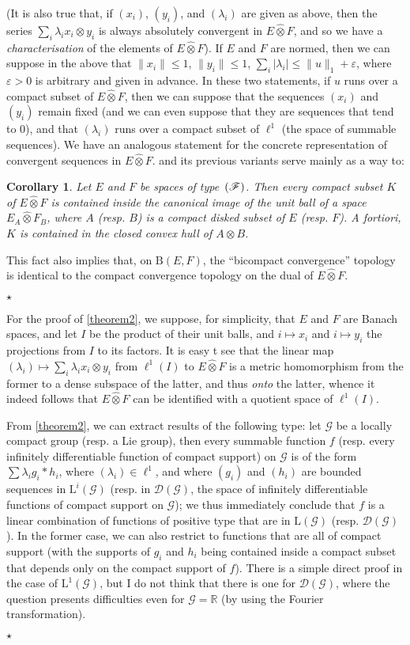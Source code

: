 \documentclass{article}
\theoremstyle{plain}
\newtheorem*{corollary}{Corollary}
\newcommand{\aster}[1]{$\star${#1}$\star$}
\newcommand{\BB}{\mathrm{B}}
\newcommand{\LL}{\mathrm{L}}
\renewcommand{\ll}{\ell}
\newcommand{\FF}{\mbox{\normalfont($\mathscr{F}$)}}
\newcommand{\hotimes}{\widehat{\otimes}}
\newcommand{\scr}{\mathscr}
\newcommand{\oldpage}[1]{\marginpar{\footnotesize$\Big\vert$ \textit{p.~#1}}}
\begin{document}
(It is also true that, if $(x_i)$, $(y_i)$, and $(\lambda_i)$ are given as above, then the series $\sum_i\lambda_i x_i\otimes y_i$ is always absolutely convergent in $E\hotimes F$, and so we have a \emph{characterisation} of the elements of $E\hotimes F$).
If $E$ and $F$ are normed, then we can suppose in the above that $\|x_i\|\leq1$, $\|y_i\|\leq1$, $\sum_i|\lambda_i|\leq\|u\|_1+\varepsilon$, where $\varepsilon>0$ is arbitrary and given in advance.
In these two statements, if $u$ runs over a compact subset of $E\hotimes F$, then we can suppose that the sequences $(x_i)$ and $(y_i)$ remain fixed (and we can even suppose that they are sequences that tend to $0$), and that $(\lambda_i)$ runs over a compact subset of $\ll^1$ (the space of summable sequences).
We have an analogous statement for the concrete representation of convergent sequences in $E\hotimes F$.
 and its previous variants serve mainly as a way to:
\begin{corollary}
  Let $E$ and $F$ be spaces of type~$\FF$.
  Then every compact subset $K$ of $E\hotimes F$ is contained inside the canonical image of the unit ball of a space $E_A\hotimes F_B$, where $A$ (resp. $B$) is a compact disked subset of $E$ (resp. $F$).
  A fortiori, $K$ is contained in the closed convex hull of $A\otimes B$.
\end{corollary}

This fact also implies that, on $\BB(E,F)$, the ``bicompact convergence'' topology is identical to the compact convergence topology on the dual of $E\hotimes F$.

\aster{%
  For the proof of \cref{theorem2}, we suppose, for simplicity, that $E$ and $F$ are Banach spaces, and let $I$ be the product of their unit balls, and $i\mapsto x_i$ and $i\mapsto y_i$ the projections from $I$ to its factors.
  It is easy t see that the linear map $(\lambda_i)\mapsto\sum_i\lambda_i x_i\otimes y_i$ from $\ll^1(I)$ to $E\hotimes F$ is a metric homomorphism from the former to a dense subspace of the latter, and thus \emph{onto} the latter, whence it indeed follows that $E\hotimes F$ can be identified with a quotient space of $\ll^1(I)$.

  From \cref{theorem2}, we can extract results of the following type:
  let $\scr{G}$ be a
\oldpage{79}
  locally compact group (resp. a Lie group), then every summable function $f$ (resp. every infinitely differentiable function of compact support) on $\scr{G}$ is of the form $\sum\lambda_i g_i*h_i$, where $(\lambda_i)\in\ll^1$, and where $(g_i)$ and $(h_i)$ are bounded sequences in $\LL^i(\scr{G})$ (resp. in $\scr{D}(\scr{G})$, the space of infinitely differentiable functions of compact support on $\scr{G}$);
  we thus immediately conclude that $f$ is a linear combination of functions of positive type that are in $\LL(\scr{G})$ (resp. $\scr{D}(\scr{G})$).
  In the former case, we can also restrict to functions that are all of compact support (with the supports of $g_i$ and $h_i$ being contained inside a compact subset that depends only on the compact support of $f$).
  There is a simple direct proof in the case of $\LL^1(\scr{G})$, but I do not think that there is one for $\scr{D}(\scr{G})$, where the question presents difficulties even for $\scr{G}=\mathbb{R}$ (by using the Fourier transformation).
}
\end{document}
